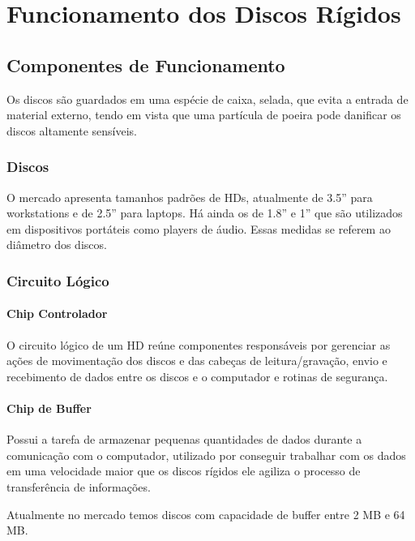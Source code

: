 \chapter{Funcionamento dos Discos Rígidos}

\section{Componentes de Funcionamento}

Os discos são guardados em uma espécie de caixa, selada, que evita a entrada de material externo, tendo em vista que uma partícula de poeira pode danificar os discos altamente sensíveis.

\subsection{Discos}

O mercado apresenta tamanhos padrões de HDs, atualmente de 3.5'' para workstations e de 2.5'' para laptops. Há ainda os de 1.8'' e 1'' que são utilizados em dispositivos portáteis como players de áudio. Essas medidas se referem ao diâmetro dos discos.

\subsection{Circuito Lógico}

\subsubsection{Chip Controlador}

O circuito lógico de um HD reúne componentes responsáveis por gerenciar as ações de movimentação dos discos e das cabeças de leitura/gravação, envio e recebimento de dados entre os discos e o computador e rotinas de segurança.

\subsubsection{Chip de Buffer}

Possui a tarefa de armazenar pequenas quantidades de dados durante a comunicação com o computador, utilizado por conseguir trabalhar com os dados em uma velocidade maior que os discos rígidos ele agiliza o processo de transferência de informações.

Atualmente no mercado temos discos com capacidade de buffer entre 2 MB e 64 MB.

